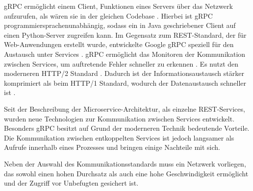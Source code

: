 gRPC ermöglicht einem Client, Funktionen eines Servers über das Netzwerk aufzurufen, als wären sie in der gleichen Codebase \parencite[vgl.][]{grpc_docs}. Hierbei ist gRPC programmiersprachenunabhängig, sodass ein in Java geschriebener Client auf einen Python-Server zugreifen kann. Im Gegensatz zum REST-Standard, der für Web-Anwendungen erstellt wurde, entwickelte Google gRPC speziell für den Austausch unter Services \parencite[vgl.][]{grpc_docs}. gRPC ermöglicht das Monitoren der Kommunikation zwischen Services, um auftretende Fehler schneller zu erkennen \parencite[vgl.][]{grpc_docs}. Es nutzt den moderneren HTTP/2 Standard \parencite[vgl.][]{grpc_wiki_2020}. Dadurch ist der Informationsaustausch stärker komprimiert als beim HTTP/1 Standard, wodurch der Datenaustausch schneller ist \parencite[vgl.][]{hypertext_wiki_2020}.

Seit der Beschreibung der Microservice-Architektur, als einzelne REST-Services\footnotemark, wurden neue Technologien zur Kommunikation zwischen Services entwickelt. Besonders gRPC besitzt auf Grund der moderneren Technik bedeutende Vorteile. Die Kommunikation zwischen entkoppelten Services ist jedoch langsamer als Aufrufe innerhalb eines Prozesses und bringen einige Nachteile mit sich.

Neben der Auswahl des Kommunikationsstandards muss ein Netzwerk vorliegen, das sowohl einen hohen Durchsatz als auch eine hohe Geschwindigkeit ermöglicht und der Zugriff vor Unbefugten gesichert ist.

